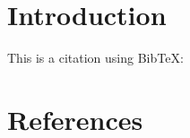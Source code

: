 \documentclass{article}
\begin{document}
\section*{Introduction}
This is a citation using BibTeX: 

\section*{References}
\end{document}
